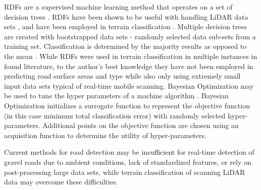 \documentclass[journal,onecolumn]{IEEEtran}
\begin{document}
	{RDFs are a supervised machine learning method that operates on a set of decision trees \cite{ho_random_1995}. RDFs have been shown to be useful with handling LiDAR data sets \cite{breiman_random_2001}, and have been employed in terrain classification \cite{laible_3d_2012,laible_map_building,laible_terrain_2013,khan_high_2011,reymann_improving_2015,schilling_geometric_2017, wietrzykowski_context-aware_2019}. Multiple decision trees are created with bootstrapped data sets - randomly selected data sub-sets from a training set. Classification is determined by the majority results as opposed to the mean \cite{breiman_random_2001,ho_random_1995}. While RDFs were used in terrain classification in multiple instances in found literature, to the author's best knowledge they have not been employed in predicting road surface areas and type while also only using extremely small input data sets typical of real-time mobile scanning. Bayesian Optimization may be used to tune the hyper parameters of a machine algorithm \cite{noauthor_bayesian_nodate, snoek_practical_2012}. Bayesian Optimization initializes a surrogate function to represent the objective function (in this case minimum total classification error) with randomly selected hyper-parameters. Additional points on the objective function are chosen using an acquisition function to determine the utility of hyper-parameters.}
	
	{Current methods for road detection may be insufficient for real-time detection of gravel roads due to ambient conditions, lack of standardized features, or rely on post-processing large data sets, while terrain classification of scanning LiDAR data may overcome these difficulties.}
	
	
	
	
	
	
\end{document}
